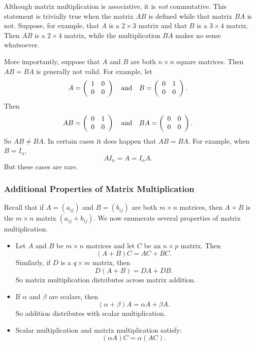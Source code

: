Although matrix multiplication is associative, it is {\em not\/}
commutative. This statement is trivially true when the matrix
$AB$ is defined while that matrix $BA$ is not.  Suppose, for
example, that $A$ is a $2\times 3$ matrix and that $B$ is a
$3\times 4$ matrix.  Then $AB$ is a $2\times 4$ matrix, while
the multiplication $BA$ makes no sense whatsoever.

More importantly, suppose that $A$ and $B$ are both $n\times n$
square matrices.  Then $AB=BA$ is generally not valid.  For
example, let
\[
A=\left(\begin{array}{cc} 1 & 0 \\ 0 & 0 \end{array}\right) \quad\mbox{and}\quad
B =\left(\begin{array}{cc} 0 & 1 \\ 0 & 0 \end{array}\right).
\]
Then
\[
AB =\left(\begin{array}{cc} 0 & 1 \\ 0 & 0 \end{array}\right)
\quad\mbox{and}\quad BA=\left(\begin{array}{cc} 0 & 0 \\ 0 & 0 \end{array}\right).
\]
So $AB\neq BA$.  In certain cases it does happen that $AB=BA$.
For example, when $B=I_n$,
\[
AI_n = A = I_nA.
\]
But these cases are rare.

\subsubsection*{Additional Properties of Matrix Multiplication}

Recall that if $A=(a_{ij})$ and $B=(b_{ij})$ are both $m\times n$ 
matrices, then $A+B$ is the $m\times n$ matrix $(a_{ij}+b_{ij})$. 
We now enumerate several properties of matrix multiplication.

\begin{itemize}

\item	Let $A$ and $B$ be $m\times n$ matrices and let $C$ be an $n\times p$
matrix.  Then
\[
(A+B)C = AC + BC.
\]
Similarly, if $D$ is a $q\times m$ matrix, then
\[
D(A+B) = DA + DB.
\]
So matrix multiplication distributes across matrix addition.

\item	If $\alpha$ and $\beta$ are scalars, then
\[
(\alpha+\beta)A = \alpha A + \beta A.
\]
So addition distributes with scalar multiplication.

\item	Scalar multiplication and matrix multiplication satisfy:
\[
(\alpha A)C = \alpha (AC).
\]
\end{itemize}

